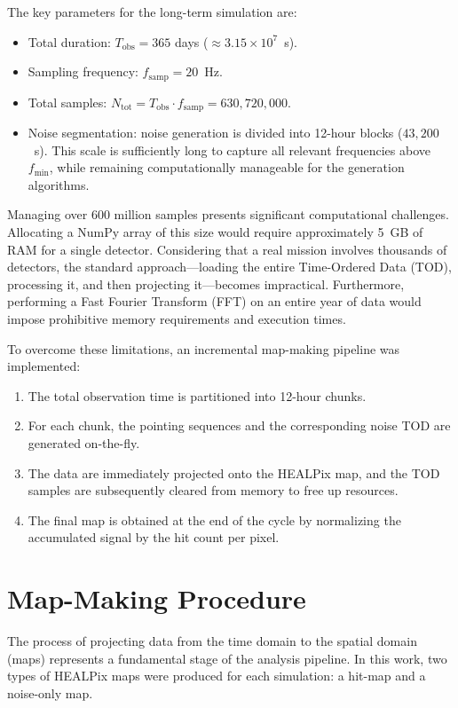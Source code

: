 The key parameters for the long-term simulation are:
\begin{itemize}
    \item Total duration: $T_{\text{obs}} = 365$ days ($\approx 3.15 \times 10^7$~s).
    \item Sampling frequency: $f_{\text{samp}} = 20$~Hz.
    \item Total samples: $N_{\text{tot}} = T_{\text{obs}} \cdot f_{\text{samp}} = 630,720,000$.
    \item Noise segmentation: noise generation is divided into 12-hour blocks ($43,200$~s). This scale is sufficiently long to capture all relevant frequencies above $f_{\text{min}}$, while remaining computationally manageable for the generation algorithms.
\end{itemize}

Managing over 600 million samples presents significant computational challenges. Allocating a NumPy array of this size would require approximately 5~GB of RAM for a single detector. Considering that a real mission involves thousands of detectors, the standard approach---loading the entire Time-Ordered Data (TOD), processing it, and then projecting it---becomes impractical. Furthermore, performing a Fast Fourier Transform (FFT) on an entire year of data would impose prohibitive memory requirements and execution times.

To overcome these limitations, an incremental map-making pipeline was implemented:
\begin{enumerate}
    \item The total observation time is partitioned into 12-hour chunks.
    \item For each chunk, the pointing sequences and the corresponding noise TOD are generated on-the-fly.
    \item The data are immediately projected onto the HEALPix map, and the TOD samples are subsequently cleared from memory to free up resources.
    \item The final map is obtained at the end of the cycle by normalizing the accumulated signal by the hit count per pixel.
\end{enumerate}




\section{Map-Making Procedure}

The process of projecting data from the time domain to the spatial domain (maps) represents a fundamental stage of the analysis pipeline. In this work, two types of HEALPix maps were produced for each simulation: a hit-map and a noise-only map.

